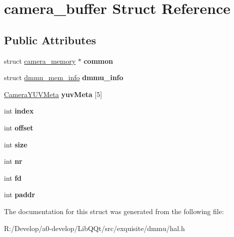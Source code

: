 \hypertarget{structcamera__buffer}{}\section{camera\+\_\+buffer Struct Reference}
\label{structcamera__buffer}
\subsection*{Public Attributes}
\begin{DoxyCompactItemize}
\item 
\mbox{\label{structcamera__buffer_abf04f350eddb8f521e521691e35fd6aa}} 
struct \mbox{\hyperlink{structcamera__memory}{camera\+\_\+memory}} $\ast$ {\bfseries common}
\item 
\mbox{\label{structcamera__buffer_a2e60b97ca39e3104ba3758604f64ecea}} 
struct \mbox{\hyperlink{structdmmu__mem__info}{dmmu\+\_\+mem\+\_\+info}} {\bfseries dmmu\+\_\+info}
\item 
\mbox{\label{structcamera__buffer_a8f006eb7b55193fa3263d0cbaa1b5f20}} 
\mbox{\hyperlink{struct_camera_y_u_v_meta}{Camera\+Y\+U\+V\+Meta}} {\bfseries yuv\+Meta} \mbox{[}5\mbox{]}
\item 
\mbox{\label{structcamera__buffer_a39545cca9a92c7066d4778d8029ab0dc}} 
int {\bfseries index}
\item 
\mbox{\label{structcamera__buffer_aaf19cbb4d1df54b20c2f54fc1590d208}} 
int {\bfseries offset}
\item 
\mbox{\label{structcamera__buffer_acd79226fc8c46cd33eca631178f9ba3b}} 
int {\bfseries size}
\item 
\mbox{\label{structcamera__buffer_a76a5a2b98169ba16aa99218b21061178}} 
int {\bfseries nr}
\item 
\mbox{\label{structcamera__buffer_af6e933f68eabff5e50348d1b76475f2e}} 
int {\bfseries fd}
\item 
\mbox{\label{structcamera__buffer_a50c7572905bc9c46ef2c192621c832b0}} 
int {\bfseries paddr}
\end{DoxyCompactItemize}


The documentation for this struct was generated from the following file\+:\begin{DoxyCompactItemize}
\item 
R\+:/\+Develop/a0-\/develop/\+Lib\+Q\+Qt/src/exquisite/dmmu/hal.\+h\end{DoxyCompactItemize}
